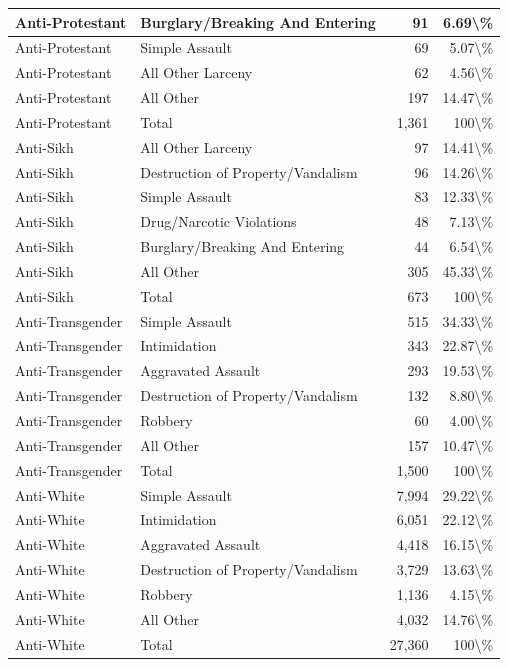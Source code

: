 \documentclass[
]{krantz}
\begin{document}
\begin{longtable}[t]{l|l|r|r}
\hline
Anti-Protestant & Burglary/Breaking And Entering & 91 & 6.69\textbackslash{}\%\\
\hline
Anti-Protestant & Simple Assault & 69 & 5.07\textbackslash{}\%\\
\hline
Anti-Protestant & All Other Larceny & 62 & 4.56\textbackslash{}\%\\
\hline
Anti-Protestant & All Other & 197 & 14.47\textbackslash{}\%\\
\hline
Anti-Protestant & Total & 1,361 & 100\textbackslash{}\%\\
\hline
Anti-Sikh & All Other Larceny & 97 & 14.41\textbackslash{}\%\\
\hline
Anti-Sikh & Destruction of Property/Vandalism & 96 & 14.26\textbackslash{}\%\\
\hline
Anti-Sikh & Simple Assault & 83 & 12.33\textbackslash{}\%\\
\hline
Anti-Sikh & Drug/Narcotic Violations & 48 & 7.13\textbackslash{}\%\\
\hline
Anti-Sikh & Burglary/Breaking And Entering & 44 & 6.54\textbackslash{}\%\\
\hline
Anti-Sikh & All Other & 305 & 45.33\textbackslash{}\%\\
\hline
Anti-Sikh & Total & 673 & 100\textbackslash{}\%\\
\hline
Anti-Transgender & Simple Assault & 515 & 34.33\textbackslash{}\%\\
\hline
Anti-Transgender & Intimidation & 343 & 22.87\textbackslash{}\%\\
\hline
Anti-Transgender & Aggravated Assault & 293 & 19.53\textbackslash{}\%\\
\hline
Anti-Transgender & Destruction of Property/Vandalism & 132 & 8.80\textbackslash{}\%\\
\hline
Anti-Transgender & Robbery & 60 & 4.00\textbackslash{}\%\\
\hline
Anti-Transgender & All Other & 157 & 10.47\textbackslash{}\%\\
\hline
Anti-Transgender & Total & 1,500 & 100\textbackslash{}\%\\
\hline
Anti-White & Simple Assault & 7,994 & 29.22\textbackslash{}\%\\
\hline
Anti-White & Intimidation & 6,051 & 22.12\textbackslash{}\%\\
\hline
Anti-White & Aggravated Assault & 4,418 & 16.15\textbackslash{}\%\\
\hline
Anti-White & Destruction of Property/Vandalism & 3,729 & 13.63\textbackslash{}\%\\
\hline
Anti-White & Robbery & 1,136 & 4.15\textbackslash{}\%\\
\hline
Anti-White & All Other & 4,032 & 14.76\textbackslash{}\%\\
\hline
Anti-White & Total & 27,360 & 100\textbackslash{}\%\\
\hline
\end{longtable}
\end{document}
